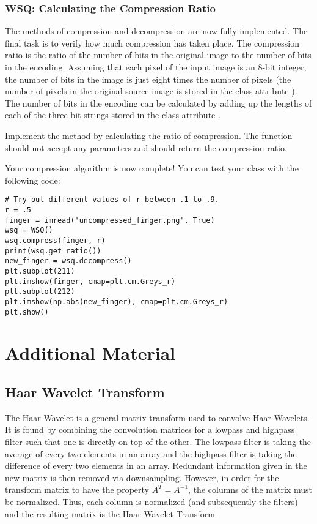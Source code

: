 \subsubsection*{WSQ: Calculating the Compression Ratio}
The methods of compression and decompression are now fully implemented. The final task is to verify how much compression has taken place.
The compression ratio is the ratio of the number of bits in the original image to the number of bits in the encoding.
Assuming that each pixel of the input image is an 8-bit integer, the number of bits in the image is just eight times the number of pixels
(the number of pixels in the original source image is stored in the class attribute ).
The number of bits in the encoding can be calculated by adding up the lengths of each of the three bit strings stored in the class attribute .
\begin{problem}
Implement the method  by calculating the ratio of compression.
The function should not accept any parameters and should return the compression ratio.

Your compression algorithm is now complete!
You can test your class with the following code:
\begin{lstlisting}
# Try out different values of r between .1 to .9.
r = .5
finger = imread('uncompressed_finger.png', True)
wsq = WSQ()
wsq.compress(finger, r)
print(wsq.get_ratio())
new_finger = wsq.decompress()
plt.subplot(211)
plt.imshow(finger, cmap=plt.cm.Greys_r)
plt.subplot(212)
plt.imshow(np.abs(new_finger), cmap=plt.cm.Greys_r)
plt.show()
\end{lstlisting}
\end{problem}
\newpage

\section*{Additional Material} %
\subsection*{Haar Wavelet Transform}
The Haar Wavelet is a general matrix transform used to convolve Haar Wavelets.
It is found by combining the convolution matrices for a lowpass and highpass filter such that one is directly on top of the other.
The lowpass filter is taking the average of every two elements in an array and the highpass filter is taking the difference of every two elements in an array.
Redundant information given in the new matrix is then removed via downsampling.
However, in order for the transform matrix to have the property $A^T=A^{-1}$, the columns of the matrix must be normalized.
Thus, each column is normalized (and subsequently the filters) and the resulting matrix is the Haar Wavelet Transform.

